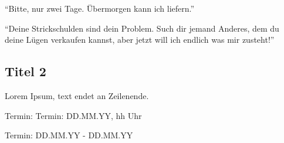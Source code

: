\enquote{Bitte, nur zwei Tage. Übermorgen kann ich liefern.}

\enquote{Deine Strickschulden sind dein Problem. Such dir jemand Anderes, dem du deine Lügen verkaufen kannst, aber jetzt will ich endlich was mir zusteht!}

\subsection{Titel 2}
Lorem Ipsum, text endet an Zeilenende.


\begin{termine}
\item Termin: Termin: DD.MM.YY, hh Uhr
  \item Termin: DD.MM.YY - DD.MM.YY
\end{termine}


